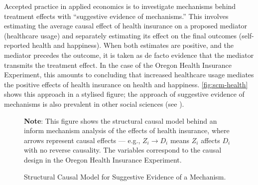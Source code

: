 Accepted practice in applied economics is to investigate mechanisms behind treatment effects with ``suggestive evidence of mechanisms.''
This involves estimating the average causal effect of health insurance on a proposed mediator (healthcare usage) and separately estimating its effect on the final outcomes (self-reported health and happiness).
When both estimates are positive, and the mediator precedes the outcome, it is taken as de facto evidence that the mediator transmits the treatment effect.
In the case of the Oregon Health Insurance Experiment, this amounts to concluding that increased healthcare usage mediates the positive effects of health insurance on health and happiness.
\autoref{fig:scm-health} shows this approach in a stylised figure; the approach of suggestive evidence of mechanisms is also prevalent in other social sciences (see \citealt{blackwell2024assumption}).

\begin{figure}[!htbp]
    \centering
    \singlespacing
    \caption{Structural Causal Model for Suggestive Evidence of a Mechanism.}
    \label{fig:scm-health}
    \justify
    \footnotesize
    \textbf{Note}:
    This figure shows the structural causal model behind an inform mechanism analysis of the effects of health insurance, where arrows represent causal effects --- e.g., $Z_i \to D_i$ means $Z_i$ affects $D_i$ with no reverse causality.
    The variables correspond to the causal design in the Oregon Health Insurance Experiment.
\end{figure}

